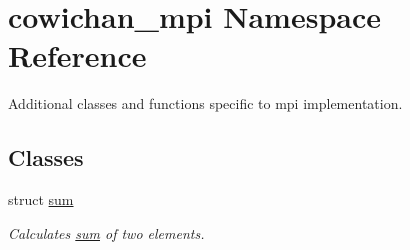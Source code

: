 \hypertarget{namespacecowichan__mpi}{
\section{cowichan\_\-mpi Namespace Reference}
\label{namespacecowichan__mpi}
}
Additional classes and functions specific to mpi implementation.  


\subsection*{Classes}
\begin{CompactItemize}
\item 
struct \hyperlink{structcowichan__mpi_1_1sum}{sum}
\begin{CompactList}\small\item\em Calculates \hyperlink{structcowichan__mpi_1_1sum}{sum} of two elements. \item\end{CompactList}\end{CompactItemize}
